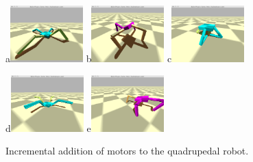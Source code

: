 \documentclass[12pt]{article}
\begin{document}
\begin{enumerate}
\begin{figure}[!t]
\centerline{
a\includegraphics[width=0.25\textwidth]{Fig1a}
b\includegraphics[width=0.25\textwidth]{Fig1b}
c\includegraphics[width=0.25\textwidth]{Fig1c}}
\centerline{
d\includegraphics[width=0.25\textwidth]{Fig1d}
e\includegraphics[width=0.25\textwidth]{Fig1e}}
\caption{Incremental addition of motors to the quadrupedal robot.}
\label{Fig1}
\end{figure}


\end{enumerate}
\end{document}
